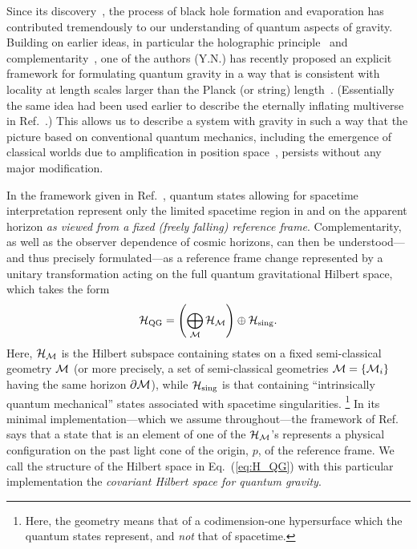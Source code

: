 \documentclass[12pt]{article}
\begin{document}
Since its discovery~\cite{Hawking:1974sw}, the process of black 
hole formation and evaporation has contributed tremendously to our 
understanding of quantum aspects of gravity.  Building on earlier ideas, 
in particular the holographic principle~\cite{'tHooft:1993gx,Bousso:1999xy} 
and complementarity~\cite{Susskind:1993if}, one of the authors (Y.N.) has 
recently proposed an explicit framework for formulating quantum gravity 
in a way that is consistent with locality at length scales larger than 
the Planck (or string) length~\cite{Nomura:2011rb}. (Essentially the same 
idea had been used earlier to describe the eternally inflating multiverse 
in Ref.~\cite{Nomura:2011dt}.)  This allows us to describe a system with 
gravity in such a way that the picture based on conventional quantum 
mechanics, including the emergence of classical worlds due to amplification 
in position space~\cite{q-Darwinism,Nomura:2011rb}, persists without 
any major modification.

In the framework given in Ref.~\cite{Nomura:2011rb}, quantum states 
allowing for spacetime interpretation represent only the limited spacetime 
region in and on the apparent horizon {\it as viewed from a fixed (freely 
falling) reference frame}.  Complementarity, as well as the observer 
dependence of cosmic horizons, can then be understood---and thus precisely 
formulated---as a reference frame change represented by a unitary 
transformation acting on the full quantum gravitational Hilbert space, 
which takes the form
%
\begin{equation}
  {\cal H}_{\rm QG} = \left( \bigoplus_{\cal M} {\cal H}_{\cal M} \right) 
    \oplus {\cal H}_{\rm sing}.
\label{eq:H_QG}
\end{equation}
%
Here, ${\cal H}_{\cal M}$ is the Hilbert subspace containing states on 
a fixed semi-classical geometry ${\cal M}$ (or more precisely, a set of 
semi-classical geometries ${\cal M} = \{ {\cal M}_i \}$ having the 
same horizon $\partial {\cal M}$), while ${\cal H}_{\rm sing}$ is that 
containing ``intrinsically quantum mechanical'' states associated with 
spacetime singularities.%
\footnote{Here, the geometry means that of a codimension-one hypersurface 
 which the quantum states represent, and {\it not} that of spacetime.}
In its minimal implementation---which we assume throughout---the framework 
of Ref.~\cite{Nomura:2011rb} says that a state that is an element of one 
of the ${\cal H}_{\cal M}$'s represents a physical configuration on the 
past light cone of the origin, $p$, of the reference frame.  We call the 
structure of the Hilbert space in Eq.~(\ref{eq:H_QG}) with this particular 
implementation the {\it covariant Hilbert space for quantum gravity}.
\end{document}
